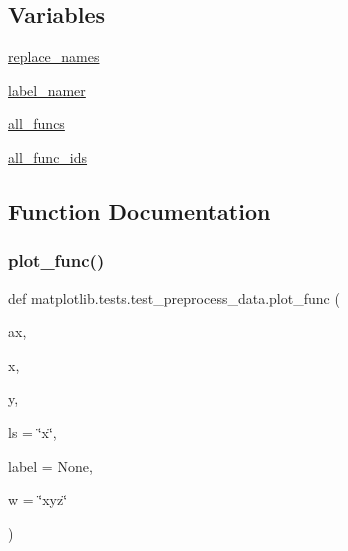 \subsection*{Variables}
\begin{DoxyCompactItemize}
\item 
\hyperlink{namespacematplotlib_1_1tests_1_1test__preprocess__data_a48f4decbf64c8d0ba32261640505ceec}{replace\+\_\+names}
\item 
\hyperlink{namespacematplotlib_1_1tests_1_1test__preprocess__data_a7a1ace9d116a00fbb5b17eb0a6645225}{label\+\_\+namer}
\item 
\hyperlink{namespacematplotlib_1_1tests_1_1test__preprocess__data_ae5076915767b74a3b5906c0e540b87d1}{all\+\_\+funcs}
\item 
\hyperlink{namespacematplotlib_1_1tests_1_1test__preprocess__data_aacdfce7d7549833649d19b2dca6e19c4}{all\+\_\+func\+\_\+ids}
\end{DoxyCompactItemize}


\subsection{Function Documentation}
\mbox{\label{namespacematplotlib_1_1tests_1_1test__preprocess__data_a0f308fb2c318c63c0311948f62c08dca}} 
\subsubsection{\texorpdfstring{plot\+\_\+func()}{plot\_func()}}
{\footnotesize\ttfamily def matplotlib.\+tests.\+test\+\_\+preprocess\+\_\+data.\+plot\+\_\+func (\begin{DoxyParamCaption}\item[{}]{ax,  }\item[{}]{x,  }\item[{}]{y,  }\item[{}]{ls = {\ttfamily \char`\"{}x\char`\"{}},  }\item[{}]{label = {\ttfamily None},  }\item[{}]{w = {\ttfamily \char`\"{}xyz\char`\"{}} }\end{DoxyParamCaption})}

